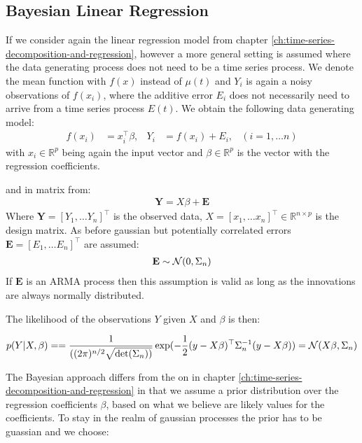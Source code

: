 \subsection{Bayesian Linear Regression}

If we consider again the linear regression model from chapter \ref{ch:time-series-decomposition-and-regression}, however
a more general setting is assumed where the data generating process does not need to be a time series process.
We denote the mean function with $f(x)$ instead of $\mu(t)$ and $Y_i$ is again a noisy observations of
$f(x_i)$, where the additive error $E_i$ does not necessarily need to arrive from a time series process $E(t)$.
We obtain the following data generating model:
\begin{align*}
    f(x_i) &= x_i^{\top}\beta, & Y_i &= f(x_i) + E_i,  & (i = 1, \dots n)
\end{align*}
with $x_i \in \mathbb{R}^p$ being again the input vector and $\beta \in \mathbb{R}^p$ is the vector with
the regression coefficients.

and in matrix from:
\begin{align*}
    \mathbf{Y} = X \beta + \mathbf{E}
\end{align*}
Where $\mathbf{Y} = [Y_{1}, \dots Y_{n}]^{\top}$ is the observed data,
$X = [x_{1}, \dots x_{n}]^{\top} \in \mathbb{R}^{n \times p}$ is the design matrix.
As before gaussian but potentially correlated errors $\mathbf{E} = [E_{1}, \dots E_{n}]^{\top}$
are assumed:
\begin{gather*}
    \mathbf{E} \sim \operatorname{\mathcal{N}}(0, \Sigma_n)
\end{gather*}
If $\mathbf{E}$ is an ARMA process then this assumption is valid as long as the
innovations are always normally distributed.

The likelihood of the observations $Y$ given $X$ and $\beta$ is then:

\begin{gather*}
    p(Y|X,\beta) =
    = \frac{1}{( (2\pi)^{n/2} \sqrt {\det(\Sigma_n))}}
    \exp(-\frac{1}{2}(y - X\beta)^{\top} \Sigma_n^{-1}(y-X\beta))
    = \operatorname{\mathcal{N}}(X \beta, \Sigma_n)
\end{gather*}

The Bayesian approach differs from the on in chapter \ref{ch:time-series-decomposition-and-regression} in
that we assume a prior distribution over the regression coefficients $\beta$, based on
what we believe are likely values for the coefficients.
To stay in the realm of gaussian processes the prior has to be guassian and we choose:

